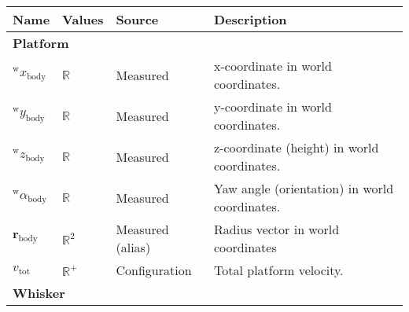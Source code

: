 \begin{table}[htb]
    \centering
    \begin{tabular}{p{1cm} p{2cm} p{3cm} p{7cm}}
        \toprule
        \textbf{Name}                           & \textbf{Values}                                    & \textbf{Source}                            & \textbf{Description}                                                                                                        \\
        \midrule
        \multicolumn{4}{l}{\textbf{Platform}} \\
        \midrule
        \(^{\mathrm{w}}x_{\textrm{body}}\)      & \(\mathbb{R}\)                                     & Measured                                   & x-coordinate in world coordinates.                                                                                          \\
        \(^{\mathrm{w}}y_{\textrm{body}}\)      & \(\mathbb{R}\)                                     & Measured                                   & y-coordinate in world coordinates.                                                                                          \\
        \(^{\mathrm{w}}z_{\textrm{body}}\)      & \(\mathbb{R}\)                                     & Measured                                   & z-coordinate (height) in world coordinates.                                                                                 \\
        \(^{\mathrm{w}}\alpha_{\textrm{body}}\) & \(\mathbb{R}\)                                     & Measured                                   & Yaw angle (orientation) in world coordinates.                                                                               \\
        \(\boldsymbol{r}_{\textrm{body}}\)      & \(\mathbb{R}^2\)                                   & Measured (alias)                           & Radius vector in world coordinates                                                                                          \\
        \(v_{\textrm{tot}}\)                    & \(\mathbb{R}^{+}\)                                 & Configuration                              & Total platform velocity.                                                                                                    \\
        \midrule
        \multicolumn{4}{l}{\textbf{Whisker}} \\

\end{tabular}
\end{table}
